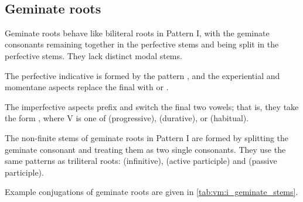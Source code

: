 \documentclass[grammar]{subfiles}
\begin{document}
\begin{table}[h!]
{    %
  }\\
  \caption{Pattern I biliteral stems \label{tab:vm:i_biliteral_stems}}
\end{table}

\subsection{Geminate roots}
\label{ssec:vm:i_geminate_roots}

Geminate roots behave like biliteral roots in Pattern I, with the geminate
consonants remaining together in the perfective stems and being split in the
perfective stems.  They lack distinct modal stems. 

The perfective indicative is formed by the pattern , and the
experiential and momentane aspects replace the final  with
 or .

The imperfective aspects prefix  and switch the final two vowels;
that is, they take the form , where V is one of
 (progressive),  (durative), or 
(habitual).


The non-finite stems of geminate roots in Pattern I are formed by splitting the
geminate consonant and treating them as two single consonants.  They use the
same patterns as triliteral roots:   (infinitive),
 (active participle) and  (passive
participle). 

Example conjugations of geminate roots are given in
\cref{tab:vm:i_geminate_stems}.
\end{document}
